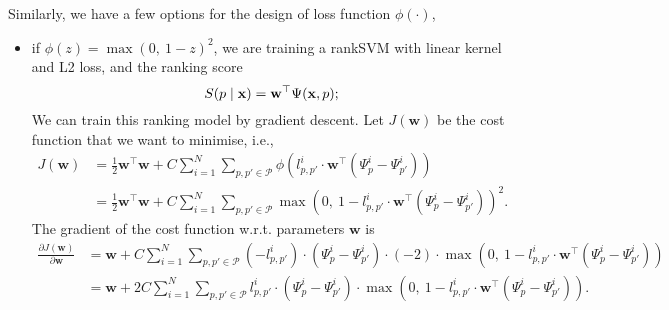Similarly, we have a few options for the design of loss function $\phi(\cdot)$,
\begin{itemize}
\item if $\phi(z) = \max(0,~ 1-z)^2$, we are training a rankSVM with linear kernel and L2 loss, and the ranking score 
      \begin{equation*}
      S(p \mid \mathbf{x})= \mathbf{w}^\top \Psi(\mathbf{x}, p);
      \end{equation*}
      We can train this ranking model by gradient descent. Let $J(\mathbf{w})$ be the cost function that we want to minimise, i.e.,
      \begin{align*}
      J(\mathbf{w})
      &= \frac{1}{2} \mathbf{w}^\top \mathbf{w} +  
         C \sum_{i=1}^N \sum_{p, p' \in \mathcal{P}} \phi \left( l_{p,p'}^i \cdot \mathbf{w}^\top (\Psi_p^i - \Psi_{p'}^i) \right) \\
      &= \frac{1}{2} \mathbf{w}^\top \mathbf{w} + 
         C \sum_{i=1}^N \sum_{p, p' \in \mathcal{P}} \max\left(0,~ 1 - l_{p,p'}^i \cdot \mathbf{w}^\top (\Psi_p^i - \Psi_{p'}^i) \right)^2.
      \end{align*}
      The gradient of the cost function w.r.t. parameters $\mathbf{w}$ is
      \begin{align*}
      \frac{\partial J(\mathbf{w})}{\partial \mathbf{w}} 
      &= \mathbf{w} + C \sum_{i=1}^N \sum_{p, p' \in \mathcal{P}} 
         (-l_{p,p'}^i) \cdot (\Psi_p^i - \Psi_{p'}^i) \cdot 
         (-2) \cdot \max\left(0,~ 1 - l_{p,p'}^i \cdot \mathbf{w}^\top (\Psi_p^i - \Psi_{p'}^i) \right) \\
      &= \mathbf{w} + 2C \sum_{i=1}^N \sum_{p, p' \in \mathcal{P}} 
         l_{p,p'}^i \cdot (\Psi_p^i - \Psi_{p'}^i) \cdot \max\left(0,~ 1 - l_{p,p'}^i \cdot \mathbf{w}^\top (\Psi_p^i - \Psi_{p'}^i) \right).
      \end{align*} 


\end{itemize}

